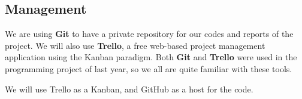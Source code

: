 \subsection{Management}

We are using \textbf{Git} to have a private repository for our codes and reports of the project. We will also use \textbf{Trello}, a free web-based project management application using the Kanban paradigm. Both \textbf{Git} and \textbf{Trello} were used in the programming project of last year, so we all are quite familiar with these tools.

We will use Trello as a Kanban, and GitHub as a host for the code. \newline

